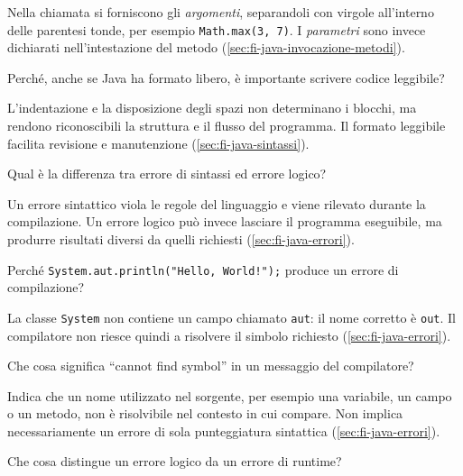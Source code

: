 Nella chiamata si forniscono gli \emph{argomenti}, separandoli con virgole
all'interno delle parentesi tonde, per esempio \texttt{Math.max(3, 7)}.
I \emph{parametri} sono invece dichiarati nell'intestazione del metodo
(\cref{sec:fi-java-invocazione-metodi}).

\clearpage

\begin{exercise}
\label{ex:fi-esercizi-introduzione-java-formato-libero}
Perché, anche se Java ha formato libero, è importante scrivere codice leggibile?
\end{exercise}

L'indentazione e la disposizione degli spazi non determinano i blocchi, ma
rendono riconoscibili la struttura e il flusso del programma. Il formato
leggibile facilita revisione e manutenzione (\cref{sec:fi-java-sintassi}).

\begin{exercise}
\label{ex:fi-esercizi-introduzione-java-errore-sintassi-logico}
Qual è la differenza tra errore di sintassi ed errore logico?
\end{exercise}

Un errore sintattico viola le regole del linguaggio e viene rilevato durante la
compilazione. Un errore logico può invece lasciare il programma eseguibile, ma
produrre risultati diversi da quelli richiesti (\cref{sec:fi-java-errori}).

\begin{exercise}
\label{ex:fi-esercizi-introduzione-java-system-aut}
Perché \texttt{System.aut.println("Hello, World!");} produce un errore di compilazione?
\end{exercise}

La classe \texttt{System} non contiene un campo chiamato \texttt{aut}: il nome
corretto è \texttt{out}. Il compilatore non riesce quindi a risolvere il simbolo
richiesto (\cref{sec:fi-java-errori}).

\begin{exercise}
\label{ex:fi-esercizi-introduzione-java-cannot-find-symbol}
Che cosa significa ``cannot find symbol'' in un messaggio del compilatore?
\end{exercise}

Indica che un nome utilizzato nel sorgente, per esempio una variabile, un campo o
un metodo, non è risolvibile nel contesto in cui compare. Non implica
necessariamente un errore di sola punteggiatura sintattica
(\cref{sec:fi-java-errori}).

\begin{exercise}
\label{ex:fi-esercizi-introduzione-java-errore-logico-runtime}
Che cosa distingue un errore logico da un errore di runtime?
\end{exercise}

